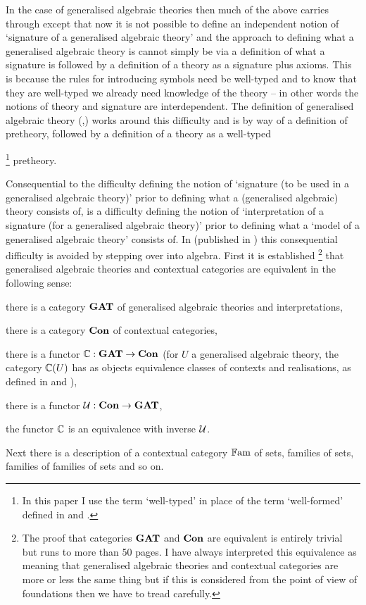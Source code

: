 In the case of generalised algebraic theories then much of the above carries through except that now 
it is not possible to define an independent notion of `signature of a generalised algebraic theory' and
the approach to defining what a generalised algebraic theory is cannot simply be via a definition of what a signature is followed by a definition 
of a theory  as a signature plus axioms. This is because the rules for introducing symbols need be well-typed and to know that
they are well-typed we already need knowledge of the theory -- in other words the notions of theory and signature are interdependent. 
The  definition of generalised algebraic theory (\cite{Cartmell78},\cite{Cartmell86})  works around this difficulty and is by way of 
a definition of pretheory, 
followed by a definition of a theory as a well-typed{\footnote{In this paper I use the term `well-typed' in place of the term `well-formed' defined in \cite{Cartmell78} and \cite{Cartmell86}.} pretheory. 

Consequential to the difficulty defining the notion of `signature 
(to be used in a generalised algebraic theory)' prior to defining
what a (generalised algebraic) theory consists of, is  a difficulty defining the notion of `interpretation of a signature (for a generalised algebraic theory)' prior to 
defining what a `model of a generalised algebraic theory' consists of.  In \cite{Cartmell78} (published in \cite{Cartmell86}) this consequential difficulty is avoided by stepping over into algebra.
First  it is established \footnote{
The proof that categories $\catGAT$ and $\catCon$ are equivalent  is entirely trivial but runs to more than 50 pages. I have always interpreted this equivalence as meaning that generalised algebraic theories and contextual categories are more or less the same thing but if this is considered from the point of view of foundations then we have to tread carefully.} 
that  generalised algebraic theories and contextual categories are equivalent in the following sense: 
\noindent \label{ccgatequivalence}
\begin{point}
there is a category $\catGAT$ of generalised algebraic theories and interpretations,
\end{point}
\begin{point}
there is a category $\catCon$ of contextual categories,
\end{point}
\begin{point}
there is a functor $\ccat[C]: \catGAT \morph \catCon$  (for $U$ a generalised algebraic theory, the category $\ccat[C](U)$ 
has as objects equivalence classes of contexts and realisations, as defined 
in \cite{Cartmell78} and  \cite{Cartmell86}), 
\end{point}
\begin{point}
there is a functor $\gat[U]:\catCon \morph \catGAT$,
\end{point}
\begin{point}
the functor $\ccat[C]$ is an equivalence with inverse $\gat[U]$.
\end{point}
Next there is a description of
a contextual category $\Fam$ of sets, families of sets, families of families of sets and so on. 

}
